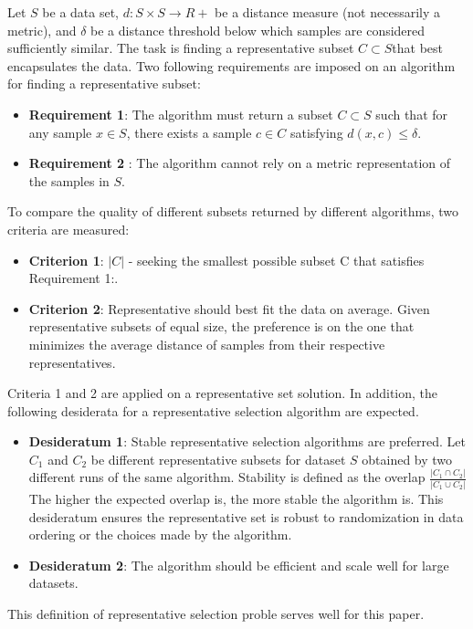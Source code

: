\documentclass[thesis=B,english]{FITthesis}[2012/10/20]
\begin{document}
Let $S$ be a data set, $d : S \times S \to R +$ be a distance measure (not necessarily a metric), and $\delta$ be a distance threshold below which samples are considered sufficiently similar.
The task is finding a representative subset $C \subset S$that best encapsulates the data.
Two following requirements are imposed on an algorithm for finding a representative subset:
\begin{itemize}
    \item \textbf{Requirement 1}: The algorithm must return a subset $C \subset S$ such that for any sample $x \in S$, there exists a sample $c \in C$ satisfying $d(x, c) \le \delta$.
    \item \textbf{Requirement 2} : The algorithm cannot rely on a metric representation of the samples in $S$.
\end{itemize}
To compare the quality of different subsets returned by different algorithms, two criteria are measured:
\begin{itemize}
    \item \textbf{Criterion 1}: $|C|$ - seeking the smallest possible subset C that satisfies Requirement 1:.
    \item \textbf{Criterion 2}: Representative should best fit the data on average. Given representative subsets of equal size, the preference is on the one that minimizes the average distance of samples from their respective representatives.
\end{itemize}
Criteria 1 and 2 are applied on a representative set solution.
In addition, the following desiderata for a representative selection algorithm are expected.
\begin{itemize}
    \item \textbf{Desideratum 1}: Stable representative selection algorithms are preferred. Let $C_1$ and $C_2$ be different representative subsets for dataset $S$ obtained by two different runs of the same algorithm.
Stability is defined as the overlap $\frac{|C_1 \cap C_2|}{|C_1 \cup C_2|}$
 The higher the expected overlap is, the more stable the
algorithm is. This desideratum ensures the representative set is robust to
randomization in data ordering or the choices made by the algorithm.
    \item \textbf{Desideratum 2}: The algorithm should be efficient and scale
well for large datasets.
\end{itemize}

This definition of representative selection proble serves well for this paper.
\end{document}
